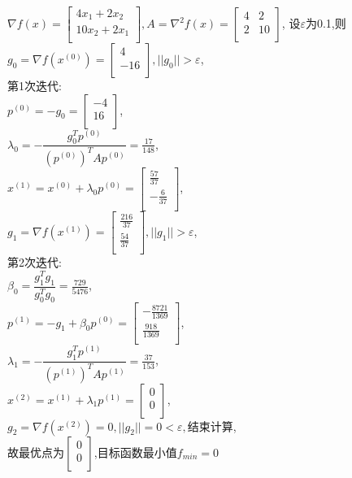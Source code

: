 \begin{solution}
    $\nabla f(x)=\begin{bmatrix}
        4x_1+2x_2  \\
        10x_2+2x_1  \\
    \end{bmatrix}, A=\nabla^2 f(x)=\begin{bmatrix}
        4  & 2  \\
        2  & 10  \\
    \end{bmatrix}$,
    设$\varepsilon$为0.1,则\\
    $g_0=\nabla f(x^{(0)})=\begin{bmatrix} 4\\-16\\\end{bmatrix},||g_0||>\varepsilon$,\\
    第1次迭代:\\
    $p^{(0)}=-g_0=\begin{bmatrix} -4\\16\\\end{bmatrix}$,\\
    $\lambda_0=-\dfrac{g_0^Tp^{(0)}}{(p^{(0)})^TAp^{(0)}}=\frac{17}{148}$,\\
    $x^{(1)}=x^{(0)}+\lambda_0p^{(0)}=\begin{bmatrix} \frac{57}{37}\\-\frac{6}{37}\\\end{bmatrix}$,\\
    $g_1=\nabla f(x^{(1)})=\begin{bmatrix} \frac{216}{37}\\\frac{54}{37}\\\end{bmatrix},||g_1||>\varepsilon$,\\
    第2次迭代:\\
    $\beta_0=\dfrac{g_1^Tg_1}{g_0^Tg_0}=\frac{729}{5476}$,\\
    $p^{(1)}=-g_1+\beta_0p^{(0)}=\begin{bmatrix} -\frac{8721}{1369}\\\frac{918}{1369}\\\end{bmatrix}$,\\
    $\lambda_1=-\dfrac{g_1^Tp^{(1)}}{(p^{(1)})^TAp^{(1)}}=\frac{37}{153}$,\\
    $x^{(2)}=x^{(1)}+\lambda_1p^{(1)}=\begin{bmatrix} 0\\0\\\end{bmatrix}$,\\
    $g_2=\nabla f(x^{(2)})=0,||g_2||=0<\varepsilon,\text{结束计算}$,\\
    故最优点为$\begin{bmatrix} 0\\0\\\end{bmatrix}$,目标函数最小值$f_{min}=0$
\end{solution}

